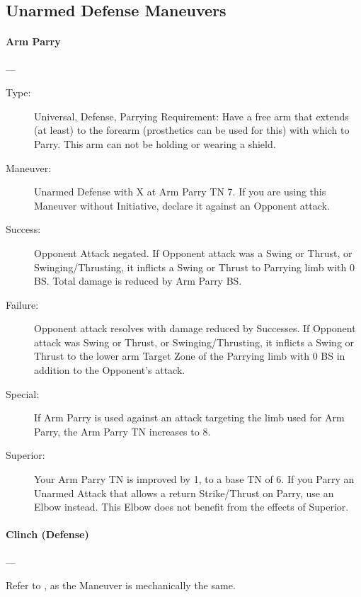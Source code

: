 \documentclass[oneside,11pt,english]{book}
\begin{document}
\subsection{Unarmed Defense Maneuvers}
\paragraph{\large\label{man:Arm Parry}Arm Parry}---\quad{\large[X]}
\vspace{-10pt}\begin{description} 
\item [Type:] Universal, Defense, Parrying Requirement: Have a free arm that
  extends (at least) to the forearm (prosthetics can be used for this) with
  which to Parry. This arm can not be holding or wearing a shield.
\item [Maneuver:] Unarmed Defense with X at Arm Parry TN 7. If you are using this Maneuver without 
  Initiative, declare it against an Opponent attack. 
\item [Success:] Opponent Attack negated. If Opponent attack was a Swing or Thrust, or Swinging/Thrusting, it 
  inflicts a Swing or Thrust to Parrying limb with 0 BS. Total damage is reduced by Arm Parry BS. 
\item [Failure:] Opponent attack resolves with damage reduced by Successes. If Opponent attack was Swing or 
  Thrust, or Swinging/Thrusting, it inflicts a Swing or Thrust to the lower arm Target Zone of the Parrying 
  limb with 0 BS in addition to the Opponent’s attack. 
\item [Special:] If Arm Parry is used against an attack targeting the limb used for Arm Parry, the Arm Parry TN 
  increases to 8. 
\item [Superior:] Your Arm Parry TN is improved by 1, to a base TN of 6. If you Parry an Unarmed Attack that 
  allows a return Strike/Thrust on Parry, use an Elbow instead. This Elbow does not benefit from the effects 
  of Superior. 
\end{description}

\paragraph{\large\label{man:Clinch (Defense)}Clinch (Defense)}---\quad{[X]}

Refer to , as the Maneuver is mechanically the same.
\end{document}

